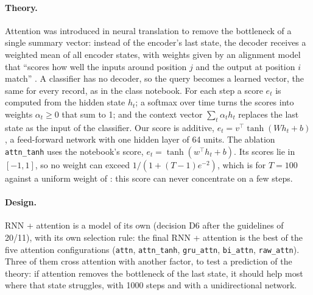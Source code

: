 \paragraph{Theory.} Attention was introduced in neural translation to remove the bottleneck of a single
summary vector: instead of the encoder's last state, the decoder receives a weighted mean of all encoder
states, with weights given by an alignment model that ``scores how well the inputs around position $j$
and the output at position $i$ match'' \cite[p.~3]{bahdanau2015neural}. A classifier has no decoder, so the
query becomes a learned vector, the same for every record, as in the class notebook. For each step a
score $e_t$ is computed from the hidden state $h_t$; a softmax over time turns the scores into weights
$\alpha_t \ge 0$ that sum to 1; and the context vector $\sum_t \alpha_t h_t$ replaces the last state as
the input of the classifier. Our score is additive, $e_t = v^\top \tanh(W h_t + b)$, a feed-forward
network with one hidden layer of 64 units. The ablation \texttt{attn\_tanh} uses the notebook's score,
$e_t = \tanh(w^\top h_t + b)$. Its scores lie in $[-1, 1]$, so no weight can exceed
$1/(1 + (T-1)e^{-2})$, which is \rnnAttnMaxBoundAttnTanh{} for $T = 100$ against a uniform weight of
\rnnAttnUniformAttnTanh{}: this score can never concentrate on a few steps.

\paragraph{Design.} RNN + attention is a model of its own (decision D6 after the guidelines of 20/11),
with its own selection rule: the final RNN + attention is the best of the five attention configurations
(\texttt{attn}, \texttt{attn\_tanh}, \texttt{gru\_attn}, \texttt{bi\_attn}, \texttt{raw\_attn}). Three of
them cross attention with another factor, to test a prediction of the theory: if attention removes the
bottleneck of the last state, it should help most where that state struggles, with 1000 steps and with a
unidirectional network.


